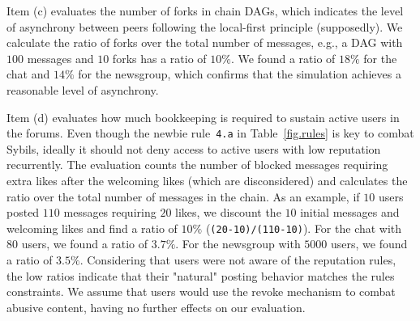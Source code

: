\documentclass[12pt]{article}
\newcommand{\code}[1]  {\texttt{\footnotesize{#1}}}
\begin{document}
Item (c) evaluates the number of forks in chain DAGs, which indicates the level
of asynchrony between peers following the local-first principle (supposedly).
We calculate the ratio of forks over the total number of messages, e.g., a DAG
with $100$ messages and $10$ forks has a ratio of $10\%$.
We found a ratio of $18\%$ for the chat and $14\%$ for the newsgroup, which
confirms that the simulation achieves a reasonable level of asynchrony.

Item (d) evaluates how much bookkeeping is required to sustain active users in
the forums.
Even though the newbie rule~\code{4.a} in Table~\ref{fig.rules} is key to
combat Sybils, ideally it should not deny access to active users with low
reputation recurrently.
%
The evaluation counts the number of blocked messages requiring extra likes
after the welcoming likes (which are disconsidered) and calculates the ratio
over the total number of messages in the chain.
As an example, if $10$ users posted $110$ messages requiring $20$ likes, we
discount the $10$ initial messages and welcoming likes and find a ratio of
$10\%$ (\code{(20-10)/(110-10)}).
%
For the chat with $80$ users, we found a ratio of $3.7\%$.
For the newsgroup with $5000$ users, we found a ratio of $3.5\%$.
%
Considering that users were not aware of the reputation rules, the low ratios
indicate that their "natural" posting behavior matches the rules constraints.
%
We assume that users would use the revoke mechanism to combat abusive content,
having no further effects on our evaluation.
\end{document}
